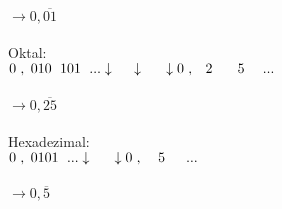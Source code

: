 \documentclass[a4paper,12pt]{article}
\begin{document}
	\paragraph{}
	$\to 0,\overline{01}$\\
	\\
	Oktal:\\
	$0 \hspace{3pt},\hspace{3pt} 010\hspace{6pt}101\hspace{6pt}...\\
	\downarrow \hspace{16pt} \downarrow \hspace{18pt} \downarrow\\
	0 \hspace{3pt},\hspace{8pt} 2 \hspace{18pt} 5 \hspace{13pt}...$
	\paragraph{}
	$\to 0,\overline{25}$\\
	\\
	Hexadezimal:\\
	$0 \hspace{3pt},\hspace{3pt} 0101 \hspace{6pt}...\\
	\downarrow \hspace{18pt} \downarrow\\
	0 \hspace{3pt},\hspace{11pt} 5\hspace{15pt}...$
	\paragraph{}
	$\to 0,\overline{5}$
\end{document}
